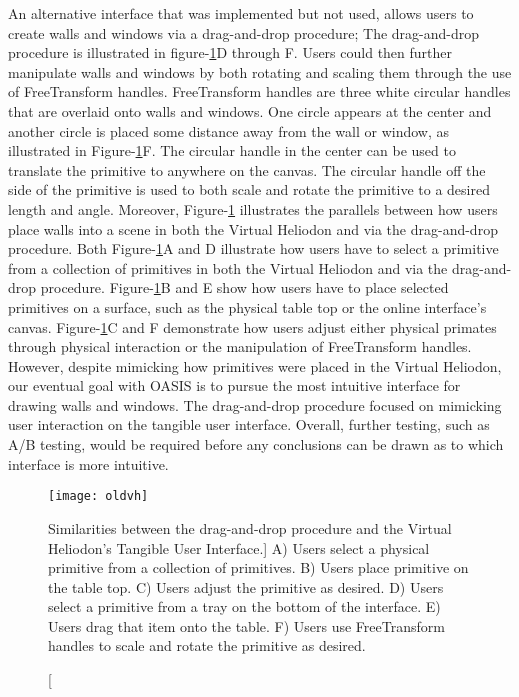 An alternative interface that was implemented but not used, allows users to create walls and windows via a drag-and-drop procedure; The drag-and-drop procedure is illustrated in figure-\ref{fig:oldvh}D through F.  Users could then further manipulate walls and windows by both rotating and scaling them through the use of FreeTransform handles.  FreeTransform handles are three white circular handles that are overlaid onto walls and windows.  One circle appears at the center and another circle is placed some distance away from the wall or window, as illustrated in Figure-\ref{fig:oldvh}F.  The circular handle in the center can be used to translate the primitive to anywhere on the canvas.  The circular handle off the side of the primitive is used to both scale and rotate the primitive to a desired length and angle.  Moreover, Figure-\ref{fig:oldvh} illustrates the parallels between how users place walls  into a scene in both the Virtual Heliodon and via the drag-and-drop procedure.  Both Figure-\ref{fig:oldvh}A and D illustrate how users have to select a primitive from a collection of primitives in both the Virtual Heliodon and via the drag-and-drop procedure.  Figure-\ref{fig:oldvh}B and E show how users have to place selected primitives on a surface, such as the physical table top or the online interface's canvas.  Figure-\ref{fig:oldvh}C and F demonstrate how users adjust either physical primates through physical interaction or the manipulation of FreeTransform handles.  However, despite mimicking how primitives were placed in the Virtual Heliodon, our eventual goal with OASIS is to pursue the most intuitive interface for drawing walls and windows.  The  drag-and-drop procedure focused on mimicking user interaction on the tangible user interface.  Overall, further testing, such as A/B testing, would be required before any conclusions can be drawn as to which interface is more intuitive.\\

\begin{figure}[!ht]
\centering
\texttt{[image: oldvh]}
\caption
[Similarities between the drag-and-drop procedure and the Virtual Heliodon's Tangible User Interface.]{
 A) Users select a physical primitive from a collection of primitives. 
 B) Users place primitive on the table top. 
 C) Users adjust the primitive as desired. 
 D) Users select a primitive from a tray on the bottom of the interface. 
 E) Users drag that item onto the table. 
 F) Users use FreeTransform handles to scale and rotate the primitive as desired.
}
\label{fig:oldvh}
\end{figure}

